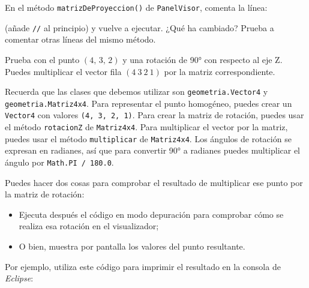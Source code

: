 \documentclass[
  spanish,
  11pt,
  a4paper,
  DIV=11,
  numbers=noendperiod]{scrartcl}
\providecommand{\tightlist}{%
  \setlength{\itemsep}{0pt}\setlength{\parskip}{0pt}}
\begin{document}
\begin{tcolorbox}[enhanced jigsaw, colframe=quarto-callout-note-color-frame, arc=.35mm, bottomrule=.15mm, left=2mm, breakable, opacityback=0, coltitle=black, bottomtitle=1mm, toptitle=1mm, titlerule=0mm, toprule=.15mm, rightrule=.15mm, title={Comprueba la rotación de la cámara}, colbacktitle=quarto-callout-note-color!10!white, opacitybacktitle=0.6, colback=white, leftrule=.75mm]

En el método \texttt{matrizDeProyeccion()} de \texttt{PanelVisor}, comenta la línea:


(añade \texttt{//} al principio) y vuelve a ejecutar. ¿Qué ha cambiado? Prueba a comentar otras líneas del mismo método.

\end{tcolorbox}

\begin{tcolorbox}[enhanced jigsaw, colframe=quarto-callout-note-color-frame, arc=.35mm, bottomrule=.15mm, left=2mm, breakable, opacityback=0, coltitle=black, bottomtitle=1mm, toptitle=1mm, titlerule=0mm, toprule=.15mm, rightrule=.15mm, title={Compruébalo con un ejemplo}, colbacktitle=quarto-callout-note-color!10!white, opacitybacktitle=0.6, colback=white, leftrule=.75mm]

Prueba con el punto \((4,\, 3,\, 2)\) y una rotación de 90° con respecto al eje Z. Puedes multiplicar el vector fila \((4\ 3\ 2\ 1)\) por la matriz correspondiente.

Recuerda que las clases que debemos utilizar son \texttt{geometria.Vector4} y \texttt{geometria.Matriz4x4}. Para representar el punto homogéneo, puedes crear un \texttt{Vector4} con valores \texttt{(4,\ 3,\ 2,\ 1)}. Para crear la matriz de rotación, puedes usar el método \texttt{rotacionZ} de \texttt{Matriz4x4}. Para multiplicar el vector por la matriz, puedes usar el método \texttt{multiplicar} de \texttt{Matriz4x4}. Los ángulos de rotación se expresan en radianes, así que para convertir 90° a radianes puedes multiplicar el ángulo por \texttt{Math.PI\ /\ 180.0}.

Puedes hacer dos cosas para comprobar el resultado de multiplicar ese punto por la matriz de rotación:

\begin{itemize}
\tightlist
\item
  Ejecuta después el código en modo depuración para comprobar cómo se realiza esa rotación en el visualizador;
\item
  O bien, muestra por pantalla los valores del punto resultante.
\end{itemize}

Por ejemplo, utiliza este código para imprimir el resultado en la consola de \emph{Eclipse}:


\end{tcolorbox}
\end{document}
